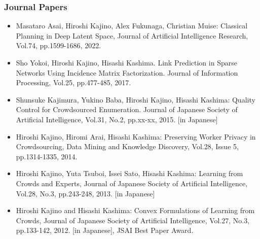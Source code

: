 \documentclass[a4paper,9pt]{article}
\begin{document}
\subsubsection*{Journal Papers}
\begin{itemize}
 \item Masataro Asai, Hiroshi Kajino, Alex Fukunaga, Christian Muise: Classical Planning in Deep Latent Space, Journal of Artificial Intelligence Research, Vol.74, pp.1599-1686, 2022.
 \item Sho Yokoi, Hiroshi Kajino, Hisashi Kashima. Link Prediction in Sparse Networks Using Incidence Matrix Factorization. Journal of Information Processing, Vol.25, pp.477-485, 2017. 
 \item Shunsuke Kajimura, Yukino Baba, Hiroshi Kajino, Hisashi Kashima: Quality Control for Crowdsourced Enumeration. Journal of Japanese Society of Artificial Intelligence, Vol.31, No.2, pp.xx-xx, 2015. [in Japanese]
 \item Hiroshi Kajino, Hiromi Arai, Hisashi Kashima: Preserving Worker Privacy in Crowdsourcing, Data Mining and Knowledge Discovery, Vol.28, Issue 5, pp.1314-1335, 2014.
 \item Hiroshi Kajino, Yuta Tsuboi, Issei Sato, Hisashi Kashima: Learning from Crowds and Experts, Journal of Japanese Society of Artificial Intelligence, Vol.28, No.3, pp.243-248, 2013. [in Japanese]
 \item Hiroshi Kajino and Hisashi Kashima: Convex Formulations of Learning from Crowds, Journal of Japanese Society of Artificial Intelligence, Vol.27, No.3, pp.133-142, 2012. [in Japanese], {JSAI Best Paper Award}.
\end{itemize}
\end{document}
